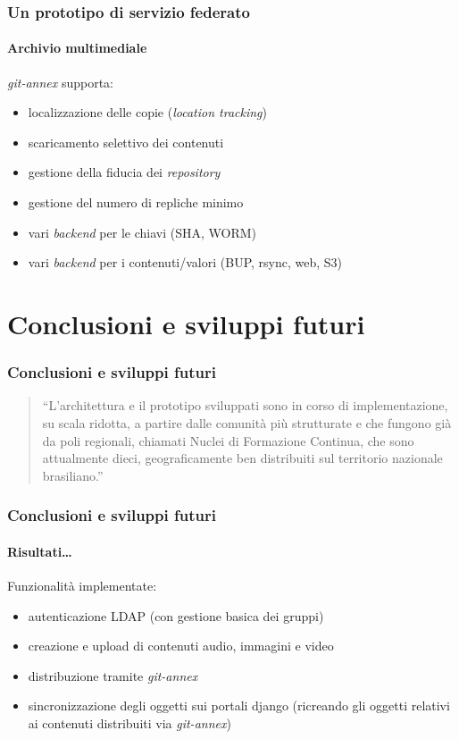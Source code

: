\documentclass{beamer}
\begin{document}
\begin{frame}
  \frametitle{Un prototipo di servizio federato}
  \framesubtitle{Archivio multimediale}
\emph{git-annex} supporta:
\begin{itemize}
\item localizzazione delle copie (\emph{location tracking})
\item scaricamento selettivo dei contenuti
\item gestione della fiducia dei \emph{repository}
\item gestione del numero di repliche minimo
\item vari \emph{backend} per le chiavi (SHA, WORM)
\item vari \emph{backend} per i contenuti/valori (BUP, rsync, web, S3)
\end{itemize}

\end{frame}

\section{Conclusioni e sviluppi futuri}

\begin{frame}
 \frametitle{Conclusioni e sviluppi futuri}
  \begin{quote}
    ``L'architettura e il prototipo sviluppati sono in corso di
    implementazione, su scala ridotta, a partire dalle comunità più
    strutturate e che fungono già da poli regionali, chiamati Nuclei
    di Formazione Continua, che sono attualmente dieci,
    geograficamente ben distribuiti sul territorio nazionale
    brasiliano.''
  \end{quote}
\end{frame}

\begin{frame}
 \frametitle{Conclusioni e sviluppi futuri}
  \framesubtitle{Risultati\ldots}
  Funzionalità implementate:
  \begin{itemize}
  \item autenticazione LDAP (con gestione basica dei gruppi)
  \item creazione e upload di contenuti audio, immagini e video
  \item distribuzione tramite \emph{git-annex}
  \item sincronizzazione degli oggetti sui portali django (ricreando
    gli oggetti relativi ai contenuti distribuiti via
    \emph{git-annex})
  \end{itemize}
\end{frame}
  
\end{document}
